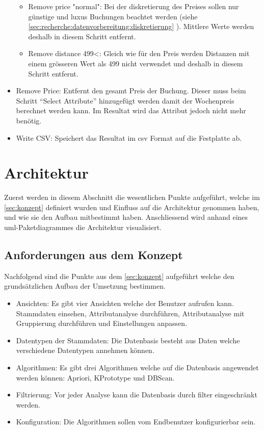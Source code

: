 \begin{itemize}
\begin{itemize}
			\item Remove price "normal": Bei der diskretierung des Preises sollen nur günstige und luxus Buchungen beachtet werden (siehe \cref{sec:recherche:datenvorbereitung:diskretierung} ). Mittlere Werte werden deshalb in diesem Schritt entfernt.
			\item Remove distance 499<: Gleich wie für den Preis werden Distanzen mit einem grösseren Wert als 499 nicht verwendet und deshalb in diesem Schritt entfernt.
 		\end{itemize}
 	\item Remove Price: Entfernt den gesamt Preis der Buchung. Dieser muss beim Schritt "`Select Attribute"' hinzugefügt werden damit der Wochenpreis berechnet werden kann. Im Resultat wird das Attribut jedoch nicht mehr benötig.
 	\item Write CSV: Speichert das Resultat im \gls{csv} Format auf die Festplatte ab.
 \end{itemize}

\section{Architektur}
\label{sec:proofofconcept:architektur}
Zuerst werden in diesem Abschnitt die wesentlichen Punkte aufgeführt, welche im \cref{sec:konzept} definiert wurden und Einfluss auf die Architektur genommen haben, und wie sie den Aufbau mitbestimmt haben. 
Anschliessend wird anhand eines \gls{uml}-Paketdiagrammes die Architektur visualisiert.

\subsection{Anforderungen aus dem Konzept}
\label{sec:proofofconcept:architektur:anforderungen}
Nachfolgend sind die Punkte aus dem \cref{sec:konzept} aufgeführt welche den grundsätzlichen Aufbau der Umsetzung bestimmen.

\begin{itemize}
	\item Ansichten: Es gibt vier Ansichten welche der Benutzer aufrufen kann. Stammdaten einsehen, Attributanalyse durchführen, Attributanalyse mit Gruppierung durchführen und Einstellungen anpassen.
	\item Datentypen der Stammdaten: Die Datenbasis besteht aus Daten welche verschiedene Datentypen annehmen können.
	\item Algorithmen: Es gibt drei Algorithmen welche auf die Datenbasis angewendet werden können: Apriori, KPrototype und DBScan.
	\item Filtrierung: Vor jeder Analyse kann die Datenbasis durch filter eingeschränkt werden.
	\item Konfiguration: Die Algorithmen sollen vom Endbenutzer konfigurierbar sein.
\end{itemize}

